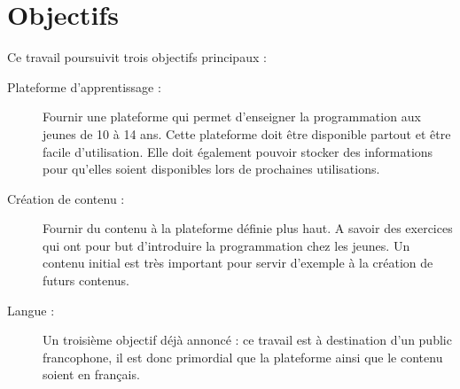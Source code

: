 \section{Objectifs}
\label{intro-objectifs}

Ce travail poursuivit trois objectifs principaux :
\begin{description}
  \item[Plateforme d'apprentissage :] Fournir une plateforme qui permet d'enseigner la programmation aux jeunes de 10 à 14 ans. Cette plateforme doit être disponible partout et être facile d'utilisation. Elle doit également pouvoir stocker des informations pour qu'elles soient disponibles lors de prochaines utilisations.
  \item[Création de contenu :] Fournir du contenu à la plateforme définie plus haut. A savoir des exercices qui ont pour but d'introduire la programmation chez les jeunes. Un contenu initial est très important pour servir d'exemple à la création de futurs contenus.
  \item[Langue :] Un troisième objectif déjà annoncé : ce travail est à destination d'un public francophone, il est donc primordial que la plateforme ainsi que le contenu soient en français.
\end{description}
